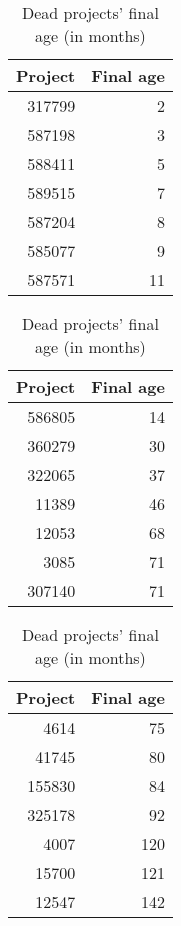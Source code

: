 \newcommand{\tableHeadDeads}{\bfseries{Project}\rm & \bfseries{Final age}\rm}
\begin{table}[ht]
\caption{Dead projects' final age (in months)}\label{table:deads}
\centering
\begin{tabular}{rr}
  \hline
  \tableHeadDeads \\ 
  \hline
317799 &   2 \\ 
  587198 &   3 \\ 
  588411 &   5 \\ 
  589515 &   7 \\ 
  587204 &   8 \\ 
  585077 &   9 \\ 
  587571 &  11 \\
  \hline
\end{tabular}
\hspace{1em}
\begin{tabular}{rr}
  \hline
  \tableHeadDeads \\
  \hline 
  586805 &  14 \\ 
  360279 &  30 \\ 
  322065 &  37 \\ 
  11389 &  46 \\ 
  12053 &  68 \\ 
  3085 &  71 \\ 
  307140 &  71 \\ 
  \hline
\end{tabular}
\hspace{1em}
\begin{tabular}{rr}
  \hline
  \tableHeadDeads \\ 
  \hline
  4614 &  75 \\ 
  41745 &  80 \\ 
  155830 &  84 \\ 
  325178 &  92 \\ 
  4007 & 120 \\ 
  15700 & 121 \\ 
  12547 & 142 \\ 
   \hline
\end{tabular}
\end{table}
